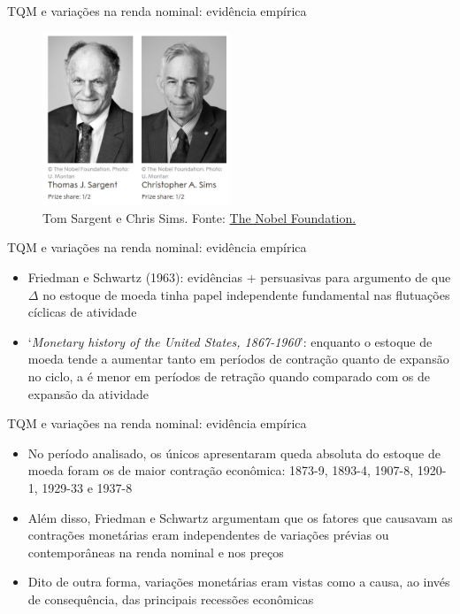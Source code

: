 \documentclass[10pt]{beamer}
\begin{document}
\begin{frame}{TQM e variações na renda nominal: evidência empírica}
    \begin{figure}
        \centering
        \includegraphics[width=0.5\textwidth]{./figures/aula10_fig4.PNG}
        \caption{Tom Sargent e Chris Sims. Fonte: \href{https://www.nobelprize.org/prizes/economic-sciences/2011/summary/}{The Nobel Foundation.}}
        \label{fig4}
    \end{figure}
\end{frame}

\begin{frame}{TQM e variações na renda nominal: evidência empírica}
    \begin{itemize}
        \item Friedman e Schwartz (1963): evidências + persuasivas para argumento de que $\Delta$ no estoque de moeda tinha papel independente fundamental nas flutuações cíclicas de atividade
        \bigskip
        \item `\emph{Monetary history of the United States, 1867-1960}': enquanto o estoque de moeda tende a aumentar tanto em períodos de contração quanto de expansão no ciclo, a  é menor em períodos de retração quando comparado com os de expansão da atividade
    \end{itemize}
\end{frame}

\begin{frame}{TQM e variações na renda nominal: evidência empírica}
    \begin{itemize}
        \item No período analisado, os únicos apresentaram queda absoluta do estoque de moeda foram os de maior contração econômica: 1873-9, 1893-4, 1907-8, 1920-1, 1929-33 e 1937-8
        \bigskip
        \item Além disso, Friedman e Schwartz argumentam que os fatores que causavam as contrações monetárias eram independentes de variações prévias ou contemporâneas na renda nominal e nos preços
        \bigskip
        \item Dito de outra forma, variações monetárias eram vistas como a causa, ao invés de consequência, das principais recessões econômicas
    \end{itemize}
\end{frame}
\end{document}
